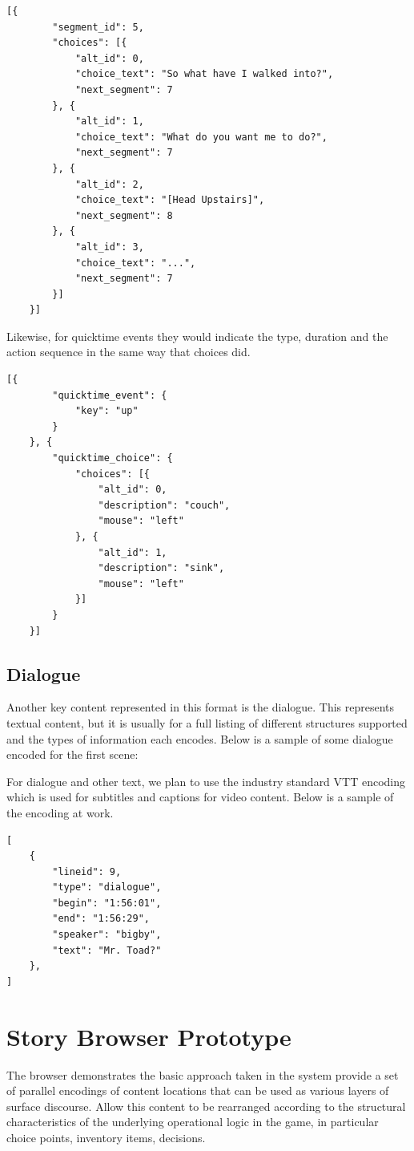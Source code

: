 \documentclass{llncs}
\begin{document}
\begin{verbatim}
[{
		"segment_id": 5,
		"choices": [{
			"alt_id": 0,
			"choice_text": "So what have I walked into?",
			"next_segment": 7
		}, {
			"alt_id": 1,
			"choice_text": "What do you want me to do?",
			"next_segment": 7
		}, {
			"alt_id": 2,
			"choice_text": "[Head Upstairs]",
			"next_segment": 8
		}, {
			"alt_id": 3,
			"choice_text": "...",
			"next_segment": 7
		}]
	}]
\end{verbatim}

Likewise, for quicktime events they would indicate the type, duration
and the action sequence in the same way that choices did.

\begin{verbatim}
[{
		"quicktime_event": {
			"key": "up"
		}
	}, {
		"quicktime_choice": {
			"choices": [{
				"alt_id": 0,
				"description": "couch",
				"mouse": "left"
			}, {
				"alt_id": 1,
				"description": "sink",
				"mouse": "left"
			}]
		}
	}]
\end{verbatim}
\subsection*{Dialogue}
\label{sec:orgheadline13}
Another key content represented in this format is the dialogue. This
represents textual content, but it is usually for a full listing of
different structures supported and the types of information each
encodes. Below is a sample of some dialogue encoded for the first
scene:

For dialogue and other text, we plan to use the industry standard VTT
encoding which is used for subtitles and captions for video
content. Below is a sample of the encoding at work.

\begin{verbatim}
[
    {
        "lineid": 9,
        "type": "dialogue",
        "begin": "1:56:01",
        "end": "1:56:29",
        "speaker": "bigby",
        "text": "Mr. Toad?"
    },
]
\end{verbatim}

\section{Story Browser Prototype}
\label{sec:orgheadline15}
The browser demonstrates the basic approach taken in the system
provide a set of parallel encodings of content locations that can be
used as various layers of surface discourse. Allow this content to be
rearranged according to the structural characteristics of the
underlying operational logic in the game, in particular choice points,
inventory items, decisions.
\end{document}
